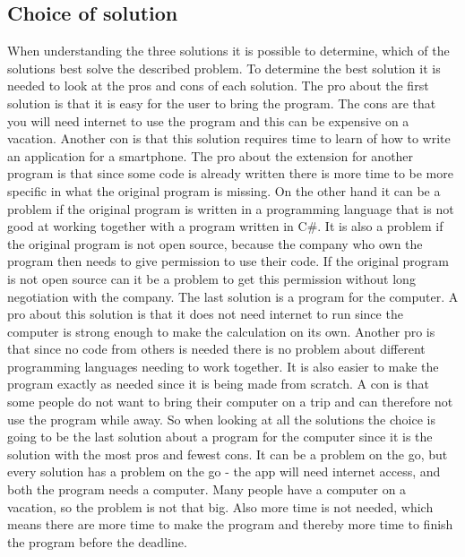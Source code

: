 \subsection{Choice of solution}
When understanding the three solutions it is possible to determine, which of the solutions best solve the described problem. To determine the best solution it is needed to look at the pros and cons of each solution. The pro about the first solution is that it is easy for the user to bring the program. The cons are that you will need internet to use the program and this can be expensive on a vacation. Another con is that this solution requires time to learn of how to write an application for a smartphone.
The pro about the extension for another program is that since some code is already written there is more time to be more specific in what the original program is missing. On the other hand it can be a problem if the original program is written in a programming language that is not good at working together with a program written in C\#. It is also a problem if the original program is not open source, because the company who own the program then needs to give permission to use their code. If the original program is not open source can it be a problem to get this permission without long negotiation with the company. The last solution is a program for the computer. A pro about this solution is that it does not need internet to run since the computer is strong enough to make the calculation on its own. Another pro is that since no code from others is needed there is no problem about different programming languages needing to work together. It is also easier to make the program exactly as needed since it is being made from scratch. A con is that some people do not want to bring their computer on a trip and can therefore not use the program while away. So when looking at all the solutions the choice is going to be the last solution about a program for the computer since it is the solution with the most pros and fewest cons. It can be a problem on the go, but every solution has a problem on the go - the app will need internet access, and both the program needs a computer. Many people have a computer on a vacation, so the problem is not that big. Also more time is not needed, which means there are more time to make the program and thereby more time to finish the program before the deadline.
